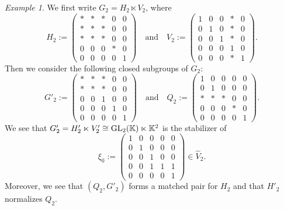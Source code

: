 \documentclass[a4paper,11pt,reqno]{amsart}
\numberwithin{equation}{section}
\theoremstyle{remark}
\newtheorem{example}[theorem]{Example}
\theoremstyle{definition}
\newcommand{\K}{\mathbb K}
\begin{document}
\begin{example}
We first write   $G_2=H_2\ltimes V_2$, where
$$
 H_2:= \begin{pmatrix}
 *&*&*&0&0\\
 *&*&*&0&0\\
 *&*&*&0 &0\\
 0&0&0&*&0\\
 0&0&0&0&1
 \end{pmatrix}
\quad\mbox{and}\quad
 V_2:=\begin{pmatrix}
 1&0&0&*&0\\
 0&1&0&*&0\\
 0&0&1&*&0\\
 0&0&0&1&0\\
 0&0&0&*&1
 \end{pmatrix}.
 $$
 Then we consider the following closed subgroups of $G_2$:
 $$
 G'_2:= \begin{pmatrix}
 *&*&*&0&0\\
 *&*&*&0&0\\
 0&0&1&0&0\\
 0&0&0&1&0\\
 0&0&0&0&1
 \end{pmatrix}
\quad\mbox{and}\quad
 Q_2:= \begin{pmatrix}
 1&0&0&0&0\\
 0&1&0&0&0\\
 *&*&*&0&0\\
 0&0&0&*&0\\
 0&0&0&0&1
 \end{pmatrix}.
$$
We see that $G'_2=H'_2\ltimes V'_2\cong {\rm GL}_2(\K)\ltimes \K^2$ is the stabilizer of
 $$
 \xi_0:=
 \begin{pmatrix}
 1&0&0&0&0\\
 0&1&0&0&0\\
 0&0&1&0&0\\
 0&0&1&1&1\\
 0&0&0&0&1
 \end{pmatrix}\in \hat V_2.
 $$
Moreover, we see that $(Q_2,G'_2)$ forms a matched pair for $H_2$ and  that
 $H'_2$ normalizes $Q_2$.


\end{example}
\end{document}
